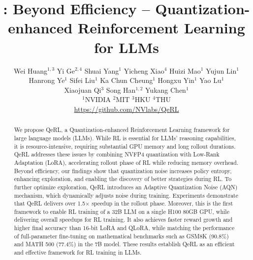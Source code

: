\documentclass{article} %
\title{{\QeRL}: Beyond Efficiency -- Quantization-enhanced Reinforcement Learning for LLMs}
\author{
\begin{minipage}[t]{\textwidth}
\centering\hspace*{-2em}
Wei Huang$^{1,3}$ \quad Yi Ge$^{2,4}$ \quad Shuai Yang$^{1}$ 
\quad Yicheng Xiao$^4$ \quad Huizi Mao$^1$  \quad  Yujun Lin$^1$\\[0.1cm]
\centering\hspace*{-2em}
Hanrong Ye$^1$ \quad  Sifei Liu$^1$ \quad  Ka Chun Cheung$^1$ \quad Hongxu Yin$^1$ \quad Yao Lu$^1$ \\[0.1cm]
\centering\hspace*{-2em}
Xiaojuan Qi$^{3}$ \quad Song Han$^{1,2}$  \quad Yukang Chen$^1$\\[0.3cm]
\centering\hspace*{-4em}
$^1$NVIDIA \quad $^2$MIT \quad $^3$HKU \quad $^4$THU
\\[0.3cm]
\centering\hspace*{-3em}\href{https://github.com/NVlabs/QeRL}{https://github.com/NVlabs/QeRL}
\end{minipage}
}
\newcommand{\QeRL}{\mbox{{{QeRL}}}}
\begin{document}
\maketitle

\begin{abstract}
We propose QeRL, a Quantization-enhanced Reinforcement Learning framework for large language models (LLMs). While RL is essential for LLMs' reasoning capabilities, it is resource-intensive, requiring substantial GPU memory and long rollout durations. QeRL addresses these issues by combining NVFP4 quantization with Low-Rank Adaptation (LoRA), accelerating rollout phase of RL while reducing memory overhead. Beyond efficiency, our findings show that quantization noise increases policy entropy, enhancing exploration, and enabling the discovery of better strategies during RL. To further optimize exploration, QeRL introduces an Adaptive Quantization Noise (AQN) mechanism, which dynamically adjusts noise during training. 
Experiments demonstrate that QeRL delivers over 1.5$\times$ speedup in the rollout phase. Moreover, this is the first framework to enable RL training of a 32B LLM on a single H100 80GB GPU, while delivering overall speedups for RL training. It also achieves faster reward growth and higher final accuracy than 16-bit LoRA and QLoRA, while matching the performance of full-parameter fine-tuning on mathematical benchmarks such as GSM8K (90.8\%) and MATH 500 (77.4\%) in the 7B model. These results establish QeRL as an efficient and effective framework for RL training in LLMs.


\end{abstract}
\end{document}
